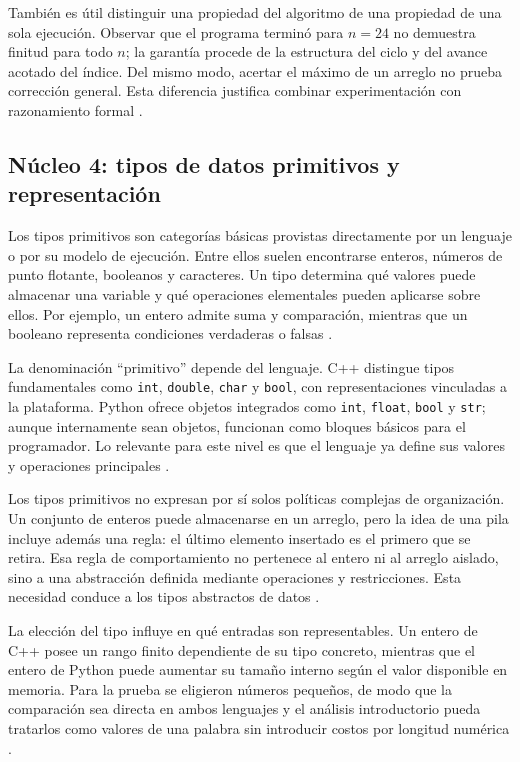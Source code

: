\documentclass[12pt,letterpaper]{article}
\newcommand{\codigo}[1]{\texttt{#1}}
\begin{document}
También es útil distinguir una propiedad del algoritmo de una propiedad de una sola ejecución. Observar que el programa terminó para $n=24$ no demuestra finitud para todo $n$; la garantía procede de la estructura del ciclo y del avance acotado del índice. Del mismo modo, acertar el máximo de un arreglo no prueba corrección general. Esta diferencia justifica combinar experimentación con razonamiento formal \citep{apt2009,hoare1969,cormen2022}.

\subsection{Núcleo 4: tipos de datos primitivos y representación}

Los tipos primitivos son categorías básicas provistas directamente por un lenguaje o por su modelo de ejecución. Entre ellos suelen encontrarse enteros, números de punto flotante, booleanos y caracteres. Un tipo determina qué valores puede almacenar una variable y qué operaciones elementales pueden aplicarse sobre ellos. Por ejemplo, un entero admite suma y comparación, mientras que un booleano representa condiciones verdaderas o falsas \citep{goodrichpy2013,goodrichcpp2011,sedgewick2011}.

La denominación ``primitivo'' depende del lenguaje. C++ distingue tipos fundamentales como \codigo{int}, \codigo{double}, \codigo{char} y \codigo{bool}, con representaciones vinculadas a la plataforma. Python ofrece objetos integrados como \codigo{int}, \codigo{float}, \codigo{bool} y \codigo{str}; aunque internamente sean objetos, funcionan como bloques básicos para el programador. Lo relevante para este nivel es que el lenguaje ya define sus valores y operaciones principales \citep{goodrichpy2013,goodrichcpp2011,python2026}.

Los tipos primitivos no expresan por sí solos políticas complejas de organización. Un conjunto de enteros puede almacenarse en un arreglo, pero la idea de una pila incluye además una regla: el último elemento insertado es el primero que se retira. Esa regla de comportamiento no pertenece al entero ni al arreglo aislado, sino a una abstracción definida mediante operaciones y restricciones. Esta necesidad conduce a los tipos abstractos de datos \citep{liskov1974,sedgewick2011,skiena2020}.

La elección del tipo influye en qué entradas son representables. Un entero de C++ posee un rango finito dependiente de su tipo concreto, mientras que el entero de Python puede aumentar su tamaño interno según el valor disponible en memoria. Para la prueba se eligieron números pequeños, de modo que la comparación sea directa en ambos lenguajes y el análisis introductorio pueda tratarlos como valores de una palabra sin introducir costos por longitud numérica \citep{goodrichcpp2011,goodrichpy2013,python2026}.
\end{document}
